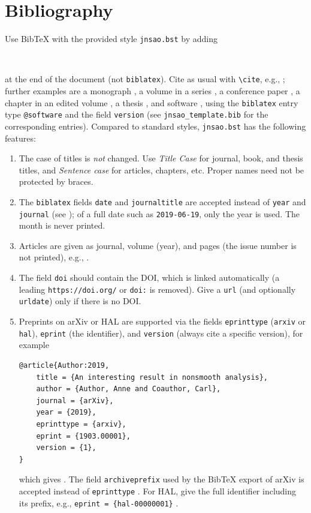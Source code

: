 \documentclass[english,review]{jnsao}
\newcommand{\cs}[1]{\texttt{\textbackslash#1}}
\newcommand{\pkg}[1]{\texttt{#1}}
\begin{document}
\section{Bibliography}\label{sec:bibliography}

Use Bib\TeX{} with the provided style \pkg{jnsao.bst} by adding
\begin{verbatim}


\end{verbatim}
at the end of the document (not \pkg{biblatex}). Cite as usual with \cs{cite}, e.g., \cite{Lamport:1994,Rockafellar:1976}; further examples are a monograph \cite{Bauschke:2017}, a volume in a series \cite{Clarke:1990}, a conference paper \cite{Author:2021}, a chapter in an edited volume \cite{Coauthor:2022}, a thesis \cite{Student:2023}, and software \cite{Author:2024}, using the \pkg{biblatex} entry type \texttt{@software} and the field \texttt{version} (see \pkg{jnsao\_template.bib} for the corresponding entries). Compared to standard styles, \pkg{jnsao.bst} has the following features:
\begin{enumerate}
    \item The case of titles is \emph{not} changed. Use \emph{Title Case} for journal, book, and thesis titles, and \emph{Sentence case} for articles, chapters, etc. Proper names need not be protected by braces.
    \item The \pkg{biblatex} fields \texttt{date} and \texttt{journaltitle} are accepted instead of \texttt{year} and \texttt{journal} (see \cite{Rockafellar:1976}); of a full date such as \texttt{2019-06-19}, only the year is used. The month is never printed.
    \item Articles are given as journal, volume (year), and pages (the issue number is not printed), e.g., \cite{Rockafellar:1976}.
    \item The field \texttt{doi} should contain the DOI, which is linked automatically (a leading \texttt{https://doi.org/} or \texttt{doi:} is removed). Give a \texttt{url} (and optionally \texttt{urldate}) only if there is no DOI.
    \item Preprints on arXiv or HAL are supported via the fields \texttt{eprinttype} (\texttt{arxiv} or \texttt{hal}), \texttt{eprint} (the identifier), and \texttt{version} (always cite a specific version), for example
\begin{verbatim}
@article{Author:2019,
    title = {An interesting result in nonsmooth analysis},
    author = {Author, Anne and Coauthor, Carl},
    journal = {arXiv},
    year = {2019},
    eprinttype = {arxiv},
    eprint = {1903.00001},
    version = {1},
}
\end{verbatim}
        which gives \cite{Author:2019}. The field \texttt{archiveprefix} used by the Bib\TeX{} export of arXiv is accepted instead of \texttt{eprinttype} \cite{Author:2020}. For HAL, give the full identifier including its prefix, e.g., \texttt{eprint = \{hal-00000001\}} \cite{Author:2019a}.
\end{enumerate}
\end{document}
